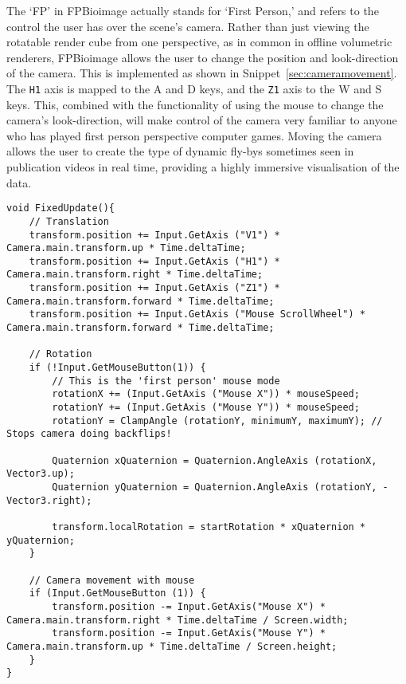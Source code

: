 The `FP' in FPBioimage actually stands for `First Person,' and refers to the control the user has over the scene's camera.
Rather than just viewing the rotatable render cube from one perspective, as in common in offline volumetric renderers, FPBioimage allows the user to change the position and look-direction of the camera.
This is implemented as shown in Snippet~\ref{sec:cameramovement}.
The \texttt{H1} axis is mapped to the A and D keys, and the \texttt{Z1} axis to the W and S keys.
This, combined with the functionality of using the mouse to change the camera's look-direction, will make control of the camera very familiar to anyone who has played first person perspective computer games.
Moving the camera allows the user to create the type of dynamic fly-bys sometimes seen in publication videos in real time, providing a highly immersive visualisation of the data.

\begin{lstlisting}[language={[Sharp]c}, label={sec:cameramovement}, caption={C\# code using built-in Unity functions for moving the camera in a first-person manner.}]
void FixedUpdate(){
	// Translation
	transform.position += Input.GetAxis ("V1") * Camera.main.transform.up * Time.deltaTime;
	transform.position += Input.GetAxis ("H1") * Camera.main.transform.right * Time.deltaTime;
	transform.position += Input.GetAxis ("Z1") * Camera.main.transform.forward * Time.deltaTime;
	transform.position += Input.GetAxis ("Mouse ScrollWheel") * Camera.main.transform.forward * Time.deltaTime;

	// Rotation
	if (!Input.GetMouseButton(1)) {
		// This is the 'first person' mouse mode
		rotationX += (Input.GetAxis ("Mouse X")) * mouseSpeed;
		rotationY += (Input.GetAxis ("Mouse Y")) * mouseSpeed;
		rotationY = ClampAngle (rotationY, minimumY, maximumY); // Stops camera doing backflips!

		Quaternion xQuaternion = Quaternion.AngleAxis (rotationX, Vector3.up);
		Quaternion yQuaternion = Quaternion.AngleAxis (rotationY, -Vector3.right);

		transform.localRotation = startRotation * xQuaternion * yQuaternion;
	}

	// Camera movement with mouse
	if (Input.GetMouseButton (1)) {
		transform.position -= Input.GetAxis("Mouse X") * Camera.main.transform.right * Time.deltaTime / Screen.width;
		transform.position -= Input.GetAxis("Mouse Y") * Camera.main.transform.up * Time.deltaTime / Screen.height;
	}
}
\end{lstlisting}

